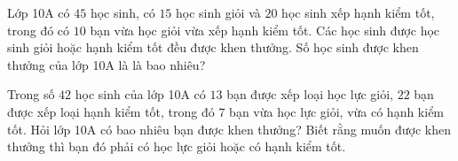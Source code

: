 \begin{baitap}%
	Lớp 10A có $45$ học sinh, có $15$ học sinh giỏi và $20$ học sinh xếp hạnh kiểm tốt, trong đó có $10$ bạn vừa học giỏi vừa xếp hạnh kiểm tốt. Các học sinh được học sinh giỏi hoặc hạnh kiểm tốt đều được khen thưởng. Số học sinh được khen thưởng của lớp 10A là là bao nhiêu?
\end{baitap}
\begin{baitap}%
	Trong số $42$ học sinh của lớp 10A có $13$ bạn được xếp loại học lực giỏi, $22$ bạn được xếp loại hạnh kiểm tốt, trong đó $7$ bạn vừa học lực giỏi, vừa có hạnh kiểm tốt. Hỏi lớp 10A có bao nhiêu bạn được khen thưởng? Biết rằng muốn được khen thưởng thì bạn đó phải có học lực giỏi hoặc có hạnh kiểm tốt.
\end{baitap}

